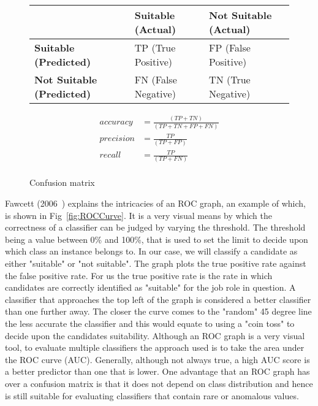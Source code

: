 \begin{figure}[h]
  \caption{Confusion matrix} \label{fig:ConfusionMatrix}
  \begin{tabular}{|l|l|l|}
    \hline
                                      & \textbf{Suitable (Actual)} & \textbf{Not Suitable (Actual)} \\ \hline
    \textbf{Suitable (Predicted)}     & TP (True Positive)         & FP (False Positive)            \\ \hline
    \textbf{Not Suitable (Predicted)} & FN (False Negative)        & TN (True Negative)             \\ \hline
  \end{tabular}

  \begin{align*}
    accuracy  & = \frac{(TP+TN)}{(TP+TN+FP+FN)} \\
    precision & = \frac{TP}{(TP+FP)}            \\
    recall    & = \frac{TP}{(TP+FN)}            \\
  \end{align*}

\end{figure}


\noindent
Fawcett (2006~\cite{fawcett2006introduction}) explains the intricacies of an ROC graph, an example of which, is shown in Fig~\ref{fig:ROCCurve}. It is a very visual means by which the correctness of a classifier can be judged by varying the threshold. The threshold being a value between 0\% and 100\%, that is used to set the limit to decide upon which class an instance belongs to. In our case, we will classify a candidate as either "suitable" or "not suitable". The graph plots the true positive rate against the false positive rate. For us the true positive rate is the rate in which candidates are correctly identified as "suitable" for the job role in question. A classifier that approaches the top left of the graph is considered a better classifier than one further away. The closer the curve comes to the "random" 45 degree line the less accurate the classifier and this would equate to using a "coin toss" to decide upon the candidates suitability. Although an ROC graph is a very visual tool, to evaluate multiple classifiers the approach used is to take the area under the ROC curve (AUC). Generally, although not always true, a high AUC score is a better predictor than one that is lower. One advantage that an ROC graph has over a confusion matrix is that it does not depend on class distribution and hence is still suitable for evaluating classifiers that contain rare or anomalous values.

